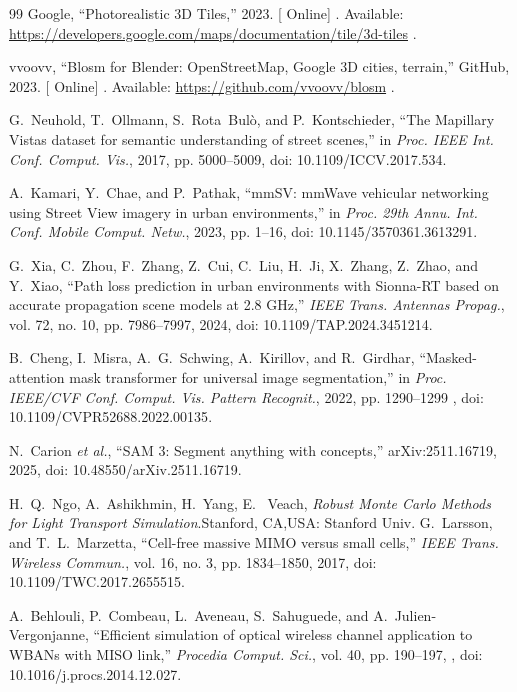 \documentclass{IEEEoj} %
\providecommand{\DIFadd}[1]{{\protect\color{blue} \sf #1}} %
\providecommand{\DIFdel}[1]{{\protect\color{red} \scriptsize #1}} %
\providecommand{\DIFaddbegin}{} %
\providecommand{\DIFaddend}{} %
\providecommand{\DIFdelbegin}{} %
\providecommand{\DIFdelend}{} %
\begin{document}
\begin{thebibliography}{99}
\DIFaddbegin {}
\DIFadd{Google, ``Photorealistic 3D Tiles,'' 2023. }[\DIFadd{Online}]\DIFadd{. Available:
}\url{https://developers.google.com/maps/documentation/tile/3d-tiles}\DIFadd{.
}

\DIFadd{vvoovv, ``Blosm for Blender: OpenStreetMap, Google 3D cities, terrain,''
GitHub, 2023. }[\DIFadd{Online}]\DIFadd{. Available: }\url{https://github.com/vvoovv/blosm}\DIFadd{.
}

\DIFaddend {}
G.~Neuhold, T.~Ollmann, S.~Rota~Bul\`o, and P.~Kontschieder,
``The Mapillary Vistas dataset for semantic understanding of street scenes,''
in \emph{Proc. IEEE Int. Conf. Comput. Vis.}, 2017, pp. 5000--5009,
doi: 10.1109/ICCV.2017.534.

A.~Kamari, Y.~Chae, and P.~Pathak, ``mmSV: mmWave vehicular networking using
Street View imagery in urban environments,'' in \emph{Proc. 29th Annu. Int.
Conf. Mobile Comput. Netw.}, 2023, pp. 1--16,
doi: 10.1145/3570361.3613291.

G.~Xia, C.~Zhou, F.~Zhang, Z.~Cui, C.~Liu, H.~Ji, X.~Zhang, Z.~Zhao, and
Y.~Xiao, ``Path loss prediction in urban environments with Sionna-RT based on
accurate propagation scene models at 2.8 GHz,'' \emph{IEEE Trans. Antennas
Propag.}, vol. 72, no. 10, pp. 7986--7997, 2024,
doi: 10.1109/TAP.2024.3451214.

B.~Cheng, I.~Misra, A.~G.~Schwing, A.~Kirillov, and R.~Girdhar,
``Masked-attention mask transformer for universal image segmentation,'' in
\emph{Proc. IEEE/CVF Conf. Comput. Vis. Pattern Recognit.}, 2022,
pp. 1290--1299\DIFaddbegin \DIFadd{, doi: 10.1109/CVPR52688.2022.00135}\DIFaddend .

N.~Carion \emph{et al.}, ``SAM 3: Segment anything with concepts,''
arXiv:2511.16719, 2025, doi: 10.48550/arXiv.2511.16719.

\DIFdelbegin {}
\DIFdelend \DIFaddbegin {}
\DIFadd{H.~Q.~Ngo, A.~Ashikhmin, H.~Yang, }\DIFaddend E.~\DIFdelbegin \DIFdel{Veach, \emph{Robust Monte Carlo Methods for Light Transport Simulation}.Stanford,
CA,USA: Stanford Univ.}\DIFdelend \DIFaddbegin \DIFadd{G.~Larsson, and T.~L.~Marzetta,
``Cell-free massive MIMO versus small cells,'' \emph{IEEE Trans. Wireless
Commun.}, vol. 16, no. 3, pp. 1834--1850, 2017,
doi: 10.1109/TWC.2017.2655515.
}

\DIFadd{A.~Behlouli, P.~Combeau, L.~Aveneau, S.~Sahuguede, and
A.~Julien-Vergonjanne, ``Efficient simulation of optical wireless channel
application to WBANs with MISO link,'' \emph{Procedia Comput. Sci.}, vol. 40,
pp. 190--197}\DIFaddend , \DIFaddbegin \DIFadd{2014, doi: 10.1016/j.procs.2014.12.027.
}


\end{thebibliography}
\end{document}
